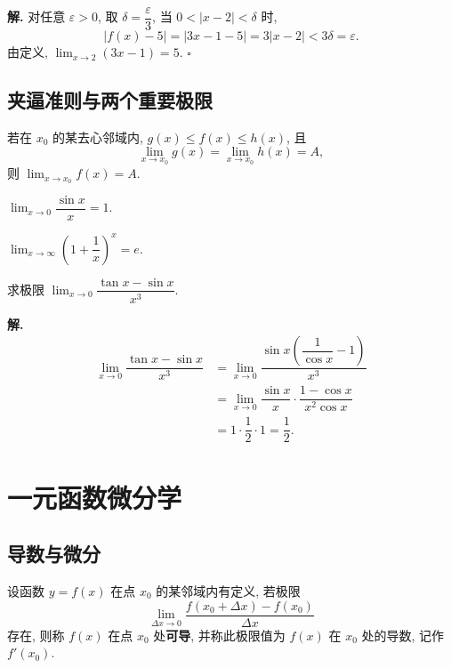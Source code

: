 \documentclass[a4paper,12pt,oneside]{maki-notes}
\begin{document}
	\textbf{解.} 对任意 $\varepsilon > 0$, 取 $\delta = \dfrac{\varepsilon}{3}$, 当 $0 < |x - 2| < \delta$ 时,
	\[
	|f(x) - 5| = |3x - 1 - 5| = 3|x - 2| < 3\delta = \varepsilon.
	\]
	由定义, $\lim_{x \to 2}(3x - 1) = 5$. \hfill $\square$
	
	\section{夹逼准则与两个重要极限}
	
	\begin{theorem}[夹逼准则]
		若在 $x_0$ 的某去心邻域内, $g(x) \le f(x) \le h(x)$, 且
		\[
		\lim_{x \to x_0} g(x) = \lim_{x \to x_0} h(x) = A,
		\]
		则 $\lim_{x \to x_0} f(x) = A$.
	\end{theorem}
	
	\begin{property}[第一个重要极限]
		$\lim_{x \to 0} \dfrac{\sin x}{x} = 1$.
	\end{property}
	
	\begin{property}[第二个重要极限]
		$\lim_{x \to \infty}\left(1 + \dfrac{1}{x}\right)^{x} = e$.
	\end{property}
	
	\begin{example}
		求极限 $\lim_{x \to 0} \dfrac{\tan x - \sin x}{x^3}$.
	\end{example}
	
	\textbf{解.}
	\begin{align*}
		\lim_{x \to 0} \dfrac{\tan x - \sin x}{x^3}
		&= \lim_{x \to 0} \dfrac{\sin x\left(\dfrac{1}{\cos x} - 1\right)}{x^3} \\[6pt]
		&= \lim_{x \to 0} \dfrac{\sin x}{x} \cdot \dfrac{1 - \cos x}{x^2 \cos x} \\[6pt]
		&= 1 \cdot \dfrac{1}{2} \cdot 1 = \dfrac{1}{2}.
	\end{align*}
	
	\chapter{一元函数微分学}
	
	\section{导数与微分}
	
	\begin{definition}[导数]
		设函数 $y = f(x)$ 在点 $x_0$ 的某邻域内有定义, 若极限
		\[
		\lim_{\Delta x \to 0} \dfrac{f(x_0 + \Delta x) - f(x_0)}{\Delta x}
		\]
		存在, 则称 $f(x)$ 在点 $x_0$ 处\textbf{可导}, 并称此极限值为 $f(x)$ 在 $x_0$ 处的导数, 记作 $f'(x_0)$.
	\end{definition}
	
\end{document}
